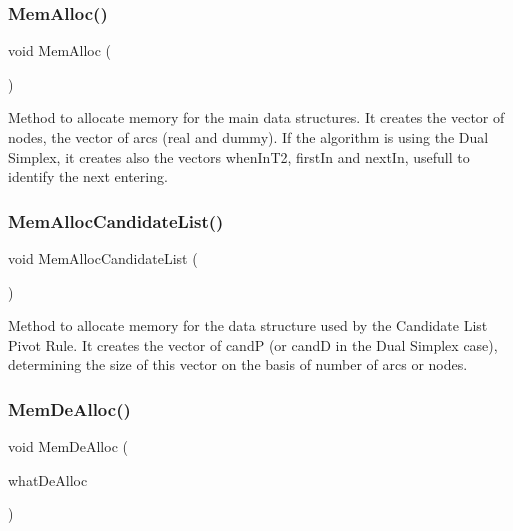 \mbox{\label{class_m_c_f_simplex_a0f5c43a76c4b5140beeaa378a659c772}} 
\subsubsection{\texorpdfstring{Mem\+Alloc()}{MemAlloc()}}
{\footnotesize\ttfamily void Mem\+Alloc (\begin{DoxyParamCaption}\item[{void}]{ }\end{DoxyParamCaption})\hspace{0.3cm}{\ttfamily [private]}}

Method to allocate memory for the main data structures. It creates the vector of nodes, the vector of arcs (real and dummy). If the algorithm is using the Dual Simplex, it creates also the vectors when\+In\+T2, first\+In and next\+In, usefull to identify the next entering. \mbox{\label{class_m_c_f_simplex_a8121db5b0073f67ecdf7db437e16aa2a}} 
\subsubsection{\texorpdfstring{Mem\+Alloc\+Candidate\+List()}{MemAllocCandidateList()}}
{\footnotesize\ttfamily void Mem\+Alloc\+Candidate\+List (\begin{DoxyParamCaption}\item[{void}]{ }\end{DoxyParamCaption})\hspace{0.3cm}{\ttfamily [private]}}

Method to allocate memory for the data structure used by the Candidate List Pivot Rule. It creates the vector of candP (or candD in the Dual Simplex case), determining the size of this vector on the basis of number of arcs or nodes. \mbox{\label{class_m_c_f_simplex_a2a005056cb70bd839ccefe601db0d98f}} 
\subsubsection{\texorpdfstring{Mem\+De\+Alloc()}{MemDeAlloc()}}
{\footnotesize\ttfamily void Mem\+De\+Alloc (\begin{DoxyParamCaption}\item[{bool}]{what\+De\+Alloc }\end{DoxyParamCaption})\hspace{0.3cm}{\ttfamily [private]}}

